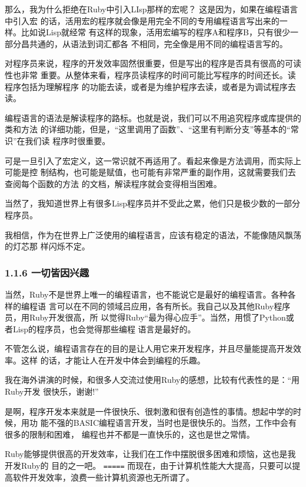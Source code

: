 \documentclass[11pt]{ctexart}
\begin{document}
那么，我为什么拒绝在Ruby中引入LIsp那样的宏呢？ 这是因为，如果在编程语言中引入宏
的话，活用宏的程序就会像是用完全不同的专用编程语言写出来的一样。比如说Lisp就经常
有这样的现象，活用宏编写的程序A和程序B，只有很少一部分昌共通的，从语法到词汇都各
不相同，完全像是用不同的编程语言写的。

对程序员来说，程序的开发效率固然很重要，但是写出的程序是否具有很高的可读性也非常
重要。从整体来看，程序员读程序的时间可能比写程序的时间还长。读程序包括为理解程序
的功能去读，或者是为维护程序去读，或者是为调试程序去读。

编程语言的语法是解读程序的路标。也就是说，我们可以不用追究程序或库提供的类和方法
的详细功能，但是，“这里调用了函数”、“这里有判断分支”等基本的“常识”在我们读
程序时很重要。

可是一旦引入了宏定义，这一常识就不再适用了。看起来像是方法调用，而实际上可能是控
制结构，也可能是赋值，也可能有非常严重的副作用，这就需要我们去查阅每个函数的方法
的文档，解读程序就会变得相当困难。

当然了，我知道世界上有很多Lisp程序员并不受此之累，他们只是极少数的一部分程序员。

我相信，作为在世界上广泛使用的编程语言，应该有稳定的语法，不能像随风飘荡的灯芯那
样闪烁不定。

\subsubsection{1.1.6 一切皆因兴趣}
\label{sec:org28c5151}

当然，Ruby不是世界上唯一的编程语言，也不能说它是最好的编程语言。各种各样的编程语
言可以在不同的领域吕应用，各有所长。我自己以及其他Ruby程序员，用Ruby开发很高，所
以觉得Ruby“最为得心应手”。当然，用惯了Python或者Lisp的程序员，也会觉得那些编程
语言是最好的。

不管怎么说，编程语言存在的目的是让人用它来开发程序，并且尽量能提高开发效率。这样
的话，才能让人在开发中体会到编程的乐趣。

我在海外讲演的时候，和很多人交流过使用Ruby的感想，比较有代表性的是：“用Ruby开发
很快乐，谢谢!”

是啊，程序开发本来就是一件很快乐、很刺激和很有创造性的事情。想起中学的时候，用功
能不强的BASIC编程语言开发，当时也是很快乐的。当然，工作中会有很多的限制和困难，
编程也并不都是一直快乐的，这也是世之常情。

Ruby能够提供很高的开发效率，让我们在工作中摆脱很多困难和烦恼，这也是我开发Ruby的
目的之一吧。
\texttt{=====}
而现在，由于计算机性能大大提高，只要可以提高软件开发效率，浪费一些计算机资源也无所谓了。
\end{document}

